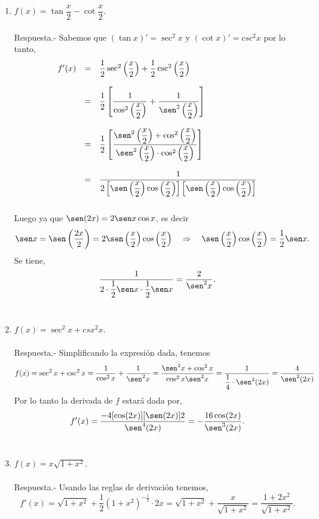 \begin{enumerate}[\bfseries 1.]
    \item $f(x)=\tan\dfrac{x}{2}-\cot\dfrac{x}{2}$.\\\\
	Respuesta.-\; Sabemos que $(\tan x)'=\sec^2 x$ y $(\cot x)'=csc^2 x$ por lo tanto,
	$$\begin{array}{rcl}
	    f'(x)&=&\dfrac{1}{2}\sec^2\left(\dfrac{x}{2}\right)+\dfrac{1}{2}\csc^2\left(\dfrac{x}{2}\right)\\\\
		 &=&\dfrac{1}{2}\left[\dfrac{1}{\cos^2\left(\dfrac{x}{2}\right)}+\dfrac{1}{\sen^2\left(\dfrac{x}{2}\right)}\right]\\\\
		 &=&\dfrac{1}{2}\left[\dfrac{\sen^2\left(\dfrac{x}{2}\right)+\cos^2\left(\dfrac{x}{2}\right)}{\sen^2\left(\dfrac{x}{2}\right)\cdot \cos^2\left(\dfrac{x}{2}\right)}\right]\\\\
		 &=&\dfrac{1}{2\left[\sen \left(\dfrac{x}{2}\right)\cos \left(\dfrac{x}{2}\right)\right]\left[\sen \left(\dfrac{x}{2}\right)\cos \left(\dfrac{x}{2}\right)\right]}\\\\
	\end{array}$$
	Luego ya que $\sen(2x)=2\sen x \cos x$, es decir 
	$$\sen x = \sen\left(\dfrac{2x}{2}\right)=2\sen \left(\dfrac{x}{2}\right)\cos \left(\dfrac{x}{2}\right)\quad \Rightarrow \quad \sen\left(\dfrac{x}{2}\right)\cos \left(\dfrac{x}{2}\right)=\dfrac{1}{2}\sen x.$$
	Se tiene,
	$$\dfrac{1}{2\cdot \dfrac{1}{2}\sen x\cdot \dfrac{1}{2}\sen x}=\dfrac{2}{\sen^2 x}.$$\\


    \item $f(x)=\sec^2 x + csx^2 x$.\\\\
	Respuesta.-\; Simplificando la expresión dada, tenemos
	$$f(x)=\sec^2 x + \csc^2 x = \dfrac{1}{\cos^2x}+\dfrac{1}{\sen^2 x}=\dfrac{\sen^2 x + \cos^2 x}{\cos^2 x \sen^2 x}=\dfrac{1}{\dfrac{1}{4}\cdot \sen^2(2x)}=\dfrac{4}{\sen^2(2x)}$$
	Por lo tanto la derivada de $f$ estará dada por,
	$$f'(x)=\dfrac{-4[\cos(2x)][\sen(2x)]2}{\sen^4(2x)}=-\dfrac{16\cos(2x)}{\sen^3(2x)}.$$\\

    \item $f(x)=x\sqrt{1+x^2}$.\\\\
	Respuesta.- \; Usando las reglas de derivación tenemos,
	$$f'(x)=\sqrt{1+x^2}+\dfrac{1}{2}\left(1+x^2\right)^{-\frac{1}{2}}\cdot2x = \sqrt{1+x^2}+\dfrac{x}{\sqrt{1+x^2}}=\dfrac{1+2x^2}{\sqrt{1+x^2}}.$$\\


\end{enumerate}
